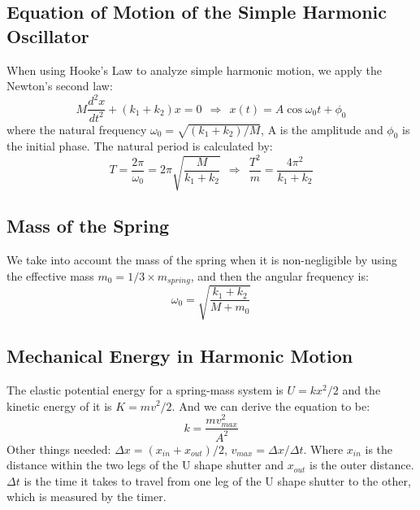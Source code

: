 \documentclass[11pt,a4paper]{article}
\begin{document}
\subsection{Equation of Motion of the Simple Harmonic Oscillator}
\qquad When using Hooke's Law to analyze simple harmonic motion, we apply the Newton's second law:
\begin{equation}
    M\frac{d^2x}{dt^2}+(k_1+k_2)x=0\ \ \Rightarrow\ \ x(t)=A\cos{\omega_0t+\phi_0}
\end{equation}
where the natural frequency $\omega_0=\sqrt{(k_1+k_2)/M}$, A is the amplitude and $\phi_0$ is the initial phase. The natural period is calculated by:
\begin{equation}
    T=\frac{2\pi}{\omega_0}=2\pi\sqrt{\frac{M}{k_1+k_2}}\ \ \Rightarrow\ \     \frac{T^2}{m}=\frac{4\pi^2}{k_1+k_2}
\end{equation}
\subsection{Mass of the Spring}
We take into account the mass of the spring when it is non-negligible by using the effective mass $m_0=1/3\times m_{spring}$, and then the angular frequency is:
\begin{equation}
    \omega_0=\sqrt{\frac{k_1+k_2}{M+m_0}}
\end{equation}
\subsection{ Mechanical Energy in Harmonic Motion}
The elastic potential energy for a spring-mass system is $U=kx^2/2$ and the kinetic energy of it is $K=mv^2/2$. And we can derive the equation to be:
\begin{equation}
    k=\frac{mv^2_{max}}{A^2}
    \label{vmaequ}
\end{equation}
Other things needed: $\Delta x=(x_{in}+x_{out})/2$, $v_{max}=\Delta x/\Delta t$. Where $x_{in}$ is the distance within the two legs of the U shape shutter and $x_{out}$ is the outer distance. $\Delta t$ is the time it takes to travel from one leg of the U shape shutter to the other, which is measured by the timer.
\end{document}

